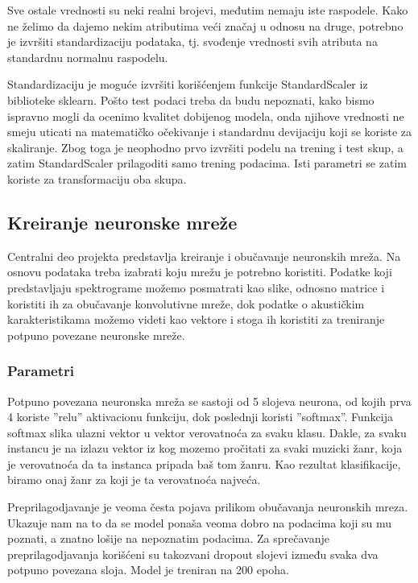 \documentclass{article}
\begin{document}
Sve ostale vrednosti su neki realni brojevi, međutim nemaju iste raspodele. Kako ne želimo da dajemo nekim atributima veći značaj u odnosu na druge, potrebno je izvršiti standardizaciju podataka, tj. svođenje vrednosti svih atributa na standardnu normalnu raspodelu.

Standardizaciju je moguće izvršiti korišćenjem funkcije StandardScaler iz biblioteke sklearn. Pošto test podaci treba da budu nepoznati, kako bismo ispravno mogli da ocenimo kvalitet dobijenog modela, onda njihove vrednosti ne smeju uticati na matematičko očekivanje i standardnu devijaciju koji se koriste za skaliranje. Zbog toga je neophodno prvo izvršiti podelu na trening i test skup, a zatim StandardScaler prilagoditi samo trening podacima. Isti parametri se zatim koriste za transformaciju oba skupa.

\subsection{Kreiranje neuronske mreže}

Centralni deo projekta predstavlja kreiranje i obučavanje neuronskih mreža. Na osnovu podataka treba izabrati koju mrežu je potrebno koristiti. Podatke koji predstavljaju spektrograme možemo posmatrati kao slike, odnosno matrice i koristiti ih za obučavanje konvolutivne mreže, dok podatke o akustičkim karakteristikama možemo videti kao vektore i stoga ih koristiti za treniranje potpuno povezane neuronske mreže.

\subsubsection{Parametri}

Potpuno povezana neuronska mreža se sastoji od 5 slojeva neurona, od kojih prva 4 koriste ''relu'' aktivacionu funkciju, dok poslednji koristi ''softmax''. Funkcija softmax slika ulazni vektor u vektor verovatnoća za svaku klasu. Dakle, za svaku instancu je na izlazu vektor iz kog mozemo pročitati za svaki muzicki žanr, koja je verovatnoća da ta instanca pripada baš tom žanru. Kao rezultat klasifikacije, biramo onaj žanr za koji je ta verovatnoća najveća.

Preprilagodjavanje je veoma česta pojava prilikom obučavanja neuronskih mreza. Ukazuje nam na to da se model ponaša veoma dobro na podacima koji su mu poznati, a znatno lošije na nepoznatim podacima. Za sprečavanje preprilagodjavanja korišćeni su takozvani dropout slojevi između svaka dva potpuno povezana sloja. Model je treniran na 200 epoha.
\end{document}
